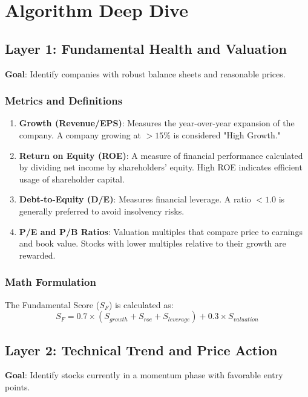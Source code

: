 \documentclass{article}
\begin{document}
\section{Algorithm Deep Dive}

\subsection{Layer 1: Fundamental Health and Valuation}
\textbf{Goal}: Identify companies with robust balance sheets and reasonable prices.
\subsubsection{Metrics and Definitions}
\begin{enumerate}
    \item \textbf{Growth (Revenue/EPS)}: Measures the year-over-year expansion of the company. A company growing at $>15\%$ is considered "High Growth."
    \item \textbf{Return on Equity (ROE)}: A measure of financial performance calculated by dividing net income by shareholders' equity. High ROE indicates efficient usage of shareholder capital.
    \item \textbf{Debt-to-Equity (D/E)}: Measures financial leverage. A ratio $<1.0$ is generally preferred to avoid insolvency risks.
    \item \textbf{P/E and P/B Ratios}: Valuation multiples that compare price to earnings and book value. Stocks with lower multiples relative to their growth are rewarded.
\end{enumerate}

\subsubsection{Math Formulation}
The Fundamental Score ($S_{F}$) is calculated as:
\begin{equation}
S_{F} = 0.7 \times (S_{growth} + S_{roe} + S_{leverage}) + 0.3 \times S_{valuation}
\end{equation}

\subsection{Layer 2: Technical Trend and Price Action}
\textbf{Goal}: Identify stocks currently in a momentum phase with favorable entry points.
\end{document}
